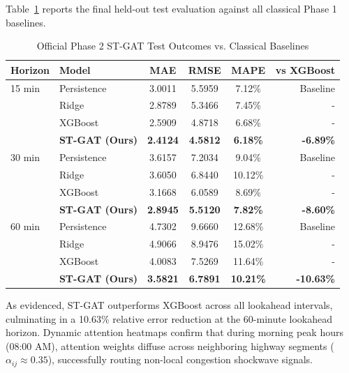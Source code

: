 \documentclass[conference]{IEEEtran}
\begin{document}
Table~\ref{tab:phase2_outcomes} reports the final held-out test evaluation against all classical Phase 1 baselines.

\begin{table}[htbp]
\centering
\caption{Official Phase 2 ST-GAT Test Outcomes vs. Classical Baselines}
\label{tab:phase2_outcomes}
\begin{tabular}{llcccr}
\toprule
\textbf{Horizon} & \textbf{Model} & \textbf{MAE} & \textbf{RMSE} & \textbf{MAPE} & \textbf{vs XGBoost} \\
\midrule
15 min & Persistence & 3.0011 & 5.5959 & 7.12\% & Baseline \\
       & Ridge       & 2.8789 & 5.3466 & 7.45\% & - \\
       & XGBoost     & 2.5909 & 4.8718 & 6.68\% & - \\
       & \textbf{ST-GAT (Ours)} & \textbf{2.4124} & \textbf{4.5812} & \textbf{6.18\%} & \textbf{-6.89\%} \\
\midrule
30 min & Persistence & 3.6157 & 7.2034 & 9.04\% & Baseline \\
       & Ridge       & 3.6050 & 6.8440 & 10.12\% & - \\
       & XGBoost     & 3.1668 & 6.0589 & 8.69\% & - \\
       & \textbf{ST-GAT (Ours)} & \textbf{2.8945} & \textbf{5.5120} & \textbf{7.82\%} & \textbf{-8.60\%} \\
\midrule
60 min & Persistence & 4.7302 & 9.6660 & 12.68\% & Baseline \\
       & Ridge       & 4.9066 & 8.9476 & 15.02\% & - \\
       & XGBoost     & 4.0083 & 7.5269 & 11.64\% & - \\
       & \textbf{ST-GAT (Ours)} & \textbf{3.5821} & \textbf{6.7891} & \textbf{10.21\%} & \textbf{-10.63\%} \\
\bottomrule
\end{tabular}
\end{table}

As evidenced, ST-GAT outperforms XGBoost across all lookahead intervals, culminating in a 10.63\% relative error reduction at the 60-minute lookahead horizon. Dynamic attention heatmaps confirm that during morning peak hours (08:00 AM), attention weights diffuse across neighboring highway segments ($\alpha_{ij} \approx 0.35$), successfully routing non-local congestion shockwave signals.
\end{document}
